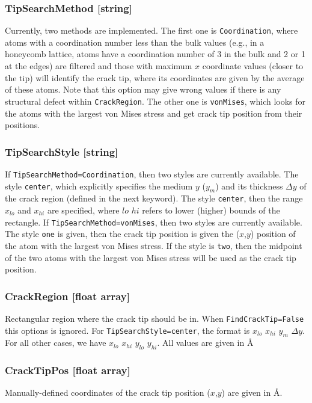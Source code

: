 \documentclass{ol-softwaremanual}
\begin{document}
\subsubsection*{TipSearchMethod [string]}
Currently, two methods are implemented. The first one is \verb|Coordination|, where atoms with a coordination number less than the bulk values (e.g., in a honeycomb lattice, atoms have a coordination number of 3 in the bulk and 2 or 1 at the edges) are filtered and those with maximum $x$ coordinate values (closer to the tip) will identify the crack tip, where its coordinates are given by the average of these atoms. Note that this option may give wrong values if there is any structural defect within \verb|CrackRegion|. The other one is \verb|vonMises|, which looks for the atoms with
the largest von Mises stress and get crack tip position from their positions.

\subsubsection*{TipSearchStyle [string]}
If \verb|TipSearchMethod=Coordination|, then two styles are currently available. The style \verb|center|, which explicitly specifies the medium $y$ ($y_m$) and its thickness $\Delta y$ of the crack region (defined in the next keyword). The style \verb|center|, then the range $x_{lo}$ and $x_{hi}$ are specified, where $lo$ $hi$ refers to lower (higher) bounds of the rectangle.
\noindent If \verb|TipSearchMethod=vonMises|, then two styles are currently available. The style \verb|one| is given, then the crack tip position is given the ($x$,$y$) position of the atom with the largest von Mises stress. If the style is \verb|two|, then the midpoint of the two atoms with the largest von Mises stress will be used as the crack tip position.

\subsubsection*{CrackRegion [float array]}
Rectangular region where the crack tip should be in. When \verb|FindCrackTip=False| this options is ignored. For \verb|TipSearchStyle=center|, the format is $x_{lo}$ $x_{hi}$ $y_{m}$ $\Delta y$. For all other cases, we have $x_{lo}$ $x_{hi}$ $y_{lo}$ $y_{hi}$. All values are given in \AA

\subsubsection*{CrackTipPos [float array]}
Manually-defined coordinates of the crack tip position ($x$,$y$) are given in \AA.
\end{document}
